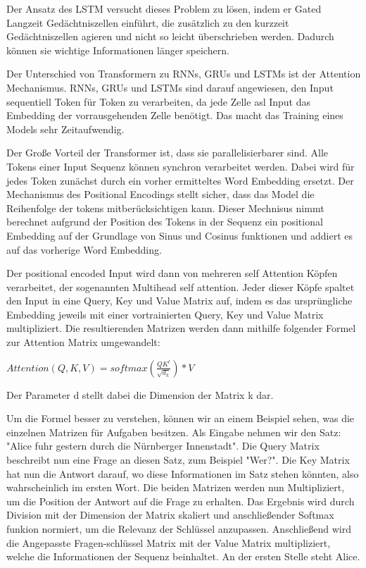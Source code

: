 Der Ansatz des LSTM versucht dieses Problem zu lösen, indem er Gated Langzeit Gedächtniszellen einführt, die zusätzlich zu den kurzzeit Gedächtniszellen agieren und nicht so leicht überschrieben werden.
Dadurch können sie wichtige Informationen länger speichern.

Der Unterschied von Transformern zu RNNs, GRUs und LSTMs ist der Attention Mechanismus.
RNNs, GRUs und LSTMs sind darauf angewiesen, den Input sequentiell Token für Token zu verarbeiten, da jede Zelle asl Input das Embedding der vorrausgehenden Zelle benötigt.
Das macht das Training eines Models sehr Zeitaufwendig.

Der Große Vorteil der Transformer ist, dass sie parallelisierbarer sind.
Alle Tokens einer Input Sequenz können synchron verarbeitet werden. 
Dabei wird für jedes Token zunächst durch ein vorher ermitteltes Word Embedding ersetzt.
Der Mechanismus des Positional Encodings stellt sicher, dass das Model die Reihenfolge der tokens mitberücksichtigen kann.
Dieser Mechnisus nimmt berechnet aufgrund der Position des Tokens in der Sequenz ein positional Embedding auf der Grundlage von Sinus und Cosinus funktionen und addiert es auf das vorherige Word Embedding.

Der positional encoded Input wird dann von mehreren self Attention Köpfen verarbeitet, der sogenannten Multihead self attention. 
Jeder dieser Köpfe spaltet den Input in eine Query, Key und Value Matrix auf, indem es das ursprüngliche Embedding jeweils mit einer vortrainierten Query, Key und Value Matrix multipliziert.
Die resultierenden Matrizen werden dann mithilfe folgender Formel zur Attention Matrix umgewandelt:

$Attention(Q,K,V)=softmax(\frac{QK^t}{\sqrt{d_k}})*V$

Der Parameter d stellt dabei die Dimension der Matrix k dar.


Um die Formel besser zu verstehen, können wir an einem Beispiel sehen, was die einzelnen Matrizen für Aufgaben besitzen.
Als Eingabe nehmen wir den Satz: "Alice fuhr gestern durch die Nürnberger Innenstadt".
Die Query Matrix beschreibt nun eine Frage an diesen Satz, zum Beispiel "Wer?".
Die Key Matrix hat nun die Antwort darauf, wo diese Informationen im Satz stehen könnten, also wahrscheinlich im ersten Wort. 
Die beiden Matrizen werden nun Multipliziert, um die Position der Antwort auf die Frage zu erhalten. 
Das Ergebnis wird durch Division mit der Dimension der Matrix skaliert und anschließender Softmax funkion normiert, um die Relevanz der Schlüssel anzupassen.
Anschließend wird die Angepasste Fragen-schlüssel Matrix mit der Value Matrix multipliziert, welche die Informationen der Sequenz beinhaltet. 
An der ersten Stelle steht Alice.

